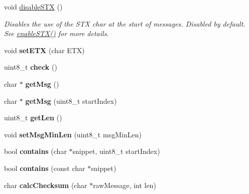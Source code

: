 \begin{DoxyCompactItemize}
void \mbox{\hyperlink{class_serial_checker_a0d68ae7dcc63103a8669ce28f1aa0069}{disable\+S\+TX}} ()
\begin{DoxyCompactList}\small\item\em Disables the use of the S\+TX char at the start of messages. Disabled by default. See \mbox{\hyperlink{class_serial_checker_a0292d1718016ff5377c9c5bd56f80149}{enable\+S\+T\+X()}} for more details. \end{DoxyCompactList}\item 
\mbox{\label{class_serial_checker_a5b39b573b66f4068383f46c4fae08819}} 
void {\bfseries set\+E\+TX} (char E\+TX)
\item 
\mbox{\label{class_serial_checker_aed2911a79c2373a4314c1a877f54ec97}} 
uint8\+\_\+t {\bfseries check} ()
\item 
\mbox{\label{class_serial_checker_a8caf3261786fa1c5418402c3c72fe836}} 
char $\ast$ {\bfseries get\+Msg} ()
\item 
\mbox{\label{class_serial_checker_a10f32797f128631baf780380d8c8d90a}} 
char $\ast$ {\bfseries get\+Msg} (uint8\+\_\+t start\+Index)
\item 
\mbox{\label{class_serial_checker_af49355fbb90691641e60c23e97771f54}} 
uint8\+\_\+t {\bfseries get\+Len} ()
\item 
\mbox{\label{class_serial_checker_af5f52cf3fa1edefb09080f6057d57fa7}} 
void {\bfseries set\+Msg\+Min\+Len} (uint8\+\_\+t msg\+Min\+Len)
\item 
\mbox{\label{class_serial_checker_a89670979931bfe27c51cb2f05080ca38}} 
bool {\bfseries contains} (char $\ast$snippet, uint8\+\_\+t start\+Index)
\item 
\mbox{\label{class_serial_checker_ad0f3acf460eba2b4e8edf8408c520ca2}} 
bool {\bfseries contains} (const char $\ast$snippet)
\item 
\mbox{\label{class_serial_checker_acebc0acae778b25712e2a4adfef323c9}} 
char {\bfseries calc\+Checksum} (char $\ast$raw\+Message, int len)

\end{DoxyCompactItemize}
